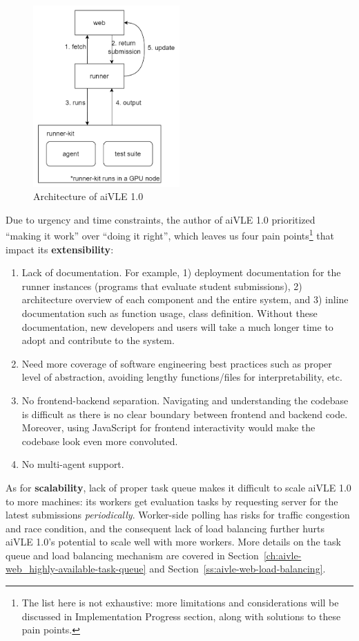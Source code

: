 \begin{figure}[H]
    \centering
    \includegraphics[width=0.5\textwidth]{images/aivle_1_arch.png}
    \caption{Architecture of aiVLE 1.0}
    \label{fig:aivle-1-arch}
\end{figure}

Due to urgency and time constraints, the author of aiVLE 1.0 prioritized “making it work” over “doing it right”, which leaves us four pain points\footnote{The list here is not exhaustive: more limitations and considerations will be discussed in Implementation Progress section, along with solutions to these pain points.} that impact its \textbf{extensibility}:

\begin{enumerate}
    \item Lack of documentation. For example, 1) deployment documentation for the runner instances (programs that evaluate student submissions), 2) architecture overview of each component and the entire system, and 3) inline documentation such as function usage, class definition. Without these documentation, new developers and users will take a much longer time to adopt and contribute to the system. 
    \item Need more coverage of software engineering best practices such as proper level of abstraction, avoiding lengthy functions/files for interpretability, etc.
    \item No frontend-backend separation. Navigating and understanding the codebase is difficult as there is no clear boundary between frontend and backend code. Moreover, using JavaScript for frontend interactivity would make the codebase look even more convoluted.
    \item No multi-agent support.
\end{enumerate}

As for \textbf{scalability}, lack of proper task queue makes it difficult to scale aiVLE 1.0 to more machines: its workers get evaluation tasks by requesting server for the latest submissions \textit{periodically}. Worker-side polling has risks for traffic congestion and race condition, and the consequent lack of load balancing further hurts aiVLE 1.0’s potential to scale well with more workers. More details on the task queue and load balancing mechanism are covered in Section~\ref{ch:aivle-web_highly-available-task-queue} and Section~\ref{ss:aivle-web-load-balancing}.